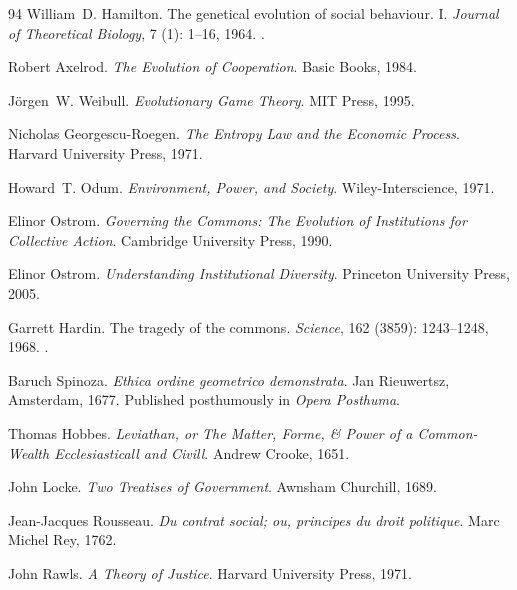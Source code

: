\documentclass[11pt]{article}
\theoremstyle{plain}
\theoremstyle{definition}
\theoremstyle{remark}
\begin{document}
\begin{thebibliography}{94}
William~D. Hamilton.
\newblock The genetical evolution of social behaviour. {I}.
\newblock \emph{Journal of Theoretical Biology}, 7 (1):
  1--16, 1964.
\newblock {}.

Robert Axelrod.
\newblock \emph{The Evolution of Cooperation}.
\newblock Basic Books, 1984.

J{\"o}rgen~W. Weibull.
\newblock \emph{Evolutionary Game Theory}.
\newblock MIT Press, 1995.

Nicholas Georgescu-Roegen.
\newblock \emph{The Entropy Law and the Economic Process}.
\newblock Harvard University Press, 1971.

Howard~T. Odum.
\newblock \emph{Environment, Power, and Society}.
\newblock Wiley-Interscience, 1971.

Elinor Ostrom.
\newblock \emph{Governing the Commons: The Evolution of Institutions for
  Collective Action}.
\newblock Cambridge University Press, 1990.

Elinor Ostrom.
\newblock \emph{Understanding Institutional Diversity}.
\newblock Princeton University Press, 2005.

Garrett Hardin.
\newblock The tragedy of the commons.
\newblock \emph{Science}, 162 (3859): 1243--1248, 1968.
\newblock {}.

Baruch Spinoza.
\newblock \emph{Ethica ordine geometrico demonstrata}.
\newblock Jan Rieuwertsz, Amsterdam, 1677.
\newblock Published posthumously in \emph{Opera Posthuma}.

Thomas Hobbes.
\newblock \emph{Leviathan, or The Matter, Forme, \& Power of a Common-Wealth
  Ecclesiasticall and Civill}.
\newblock Andrew Crooke, 1651.

John Locke.
\newblock \emph{Two Treatises of Government}.
\newblock Awnsham Churchill, 1689.

Jean-Jacques Rousseau.
\newblock \emph{Du contrat social; ou, principes du droit politique}.
\newblock Marc Michel Rey, 1762.

John Rawls.
\newblock \emph{A Theory of Justice}.
\newblock Harvard University Press, 1971.


\end{thebibliography}
\end{document}
